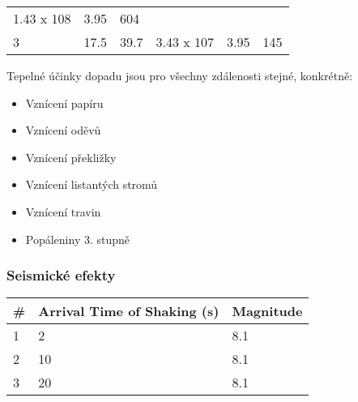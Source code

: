 \documentclass[
]{article}
\providecommand{\tightlist}{%
  \setlength{\itemsep}{0pt}\setlength{\parskip}{0pt}}
\begin{document}
\begin{longtable}[]{@{}llllll@{}}
\begin{minipage}[t]{0.14\columnwidth}
1.43 x 108\strut
\end{minipage} & \begin{minipage}[t]{0.17\columnwidth}\raggedright
3.95\strut
\end{minipage} & \begin{minipage}[t]{0.17\columnwidth}\raggedright
604\strut
\end{minipage}\tabularnewline
\begin{minipage}[t]{0.02\columnwidth}\raggedright
3\strut
\end{minipage} & \begin{minipage}[t]{0.21\columnwidth}\raggedright
17.5\strut
\end{minipage} & \begin{minipage}[t]{0.13\columnwidth}\raggedright
39.7\strut
\end{minipage} & \begin{minipage}[t]{0.14\columnwidth}\raggedright
3.43 x 107\strut
\end{minipage} & \begin{minipage}[t]{0.17\columnwidth}\raggedright
3.95\strut
\end{minipage} & \begin{minipage}[t]{0.17\columnwidth}\raggedright
145\strut
\end{minipage}\tabularnewline
\bottomrule
\end{longtable}

Tepelné účinky dopadu jsou pro všechny zdálenosti stejné, konkrétně:

\begin{itemize}
\tightlist
\item
  Vznícení papíru
\item
  Vznícení oděvů
\item
  Vznícení překližky
\item
  Vznícení listantých stromů
\item
  Vznícení travin
\item
  Popáleniny 3. stupně
\end{itemize}

\hypertarget{seismickuxe9-efekty}{%
\subsubsection{Seismické efekty}\label{seismickuxe9-efekty}}

\begin{longtable}[]{@{}lll@{}}
\toprule
\# & Arrival Time of Shaking (s) & Magnitude\tabularnewline
\midrule
\endhead
1 & 2 & 8.1\tabularnewline
2 & 10 & 8.1\tabularnewline
3 & 20 & 8.1\tabularnewline
\bottomrule
\end{longtable}
\end{document}
